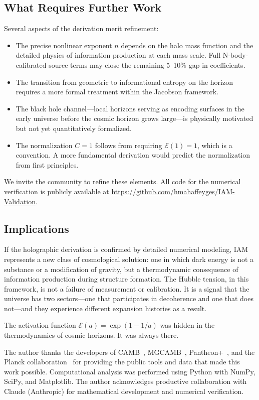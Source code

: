 \documentclass[twocolumn,superscriptaddress,prl,amsmath,amssymb]{revtex4-2}
\begin{document}
\subsection{What Requires Further Work}

Several aspects of the derivation merit refinement:
\begin{itemize}
\item The precise nonlinear exponent $n$ depends on the halo mass function and the detailed physics of information production at each mass scale. Full N-body-calibrated source terms may close the remaining 5--10\% gap in coefficients.
\item The transition from geometric to informational entropy on the horizon requires a more formal treatment within the Jacobson framework.
\item The black hole channel---local horizons serving as encoding surfaces in the early universe before the cosmic horizon grows large---is physically motivated but not yet quantitatively formalized.
\item The normalization $C = 1$ follows from requiring $\mathcal{E}(1) = 1$, which is a convention. A more fundamental derivation would predict the normalization from first principles.
\end{itemize}

We invite the community to refine these elements. All code for the numerical verification is publicly available at \url{https://github.com/hmahaffeyges/IAM-Validation}.

\subsection{Implications}

If the holographic derivation is confirmed by detailed numerical modeling, IAM represents a new class of cosmological solution: one in which dark energy is not a substance or a modification of gravity, but a thermodynamic consequence of information production during structure formation. The Hubble tension, in this framework, is not a failure of measurement or calibration. It is a signal that the universe has two sectors---one that participates in decoherence and one that does not---and they experience different expansion histories as a result.

The activation function $\mathcal{E}(a) = \exp(1-1/a)$ was hidden in the thermodynamics of cosmic horizons. It was always there.

\begin{acknowledgments}
The author thanks the developers of CAMB~\cite{Lewis2000}, MGCAMB~\cite{Zhao2009,Hojjati2011}, Pantheon+~\cite{Scolnic2022,Brout2022}, and the Planck collaboration~\cite{PlanckCollaboration2020} for providing the public tools and data that made this work possible. Computational analysis was performed using Python with NumPy, SciPy, and Matplotlib. The author acknowledges productive collaboration with Claude (Anthropic) for mathematical development and numerical verification.
\end{acknowledgments}
\end{document}
